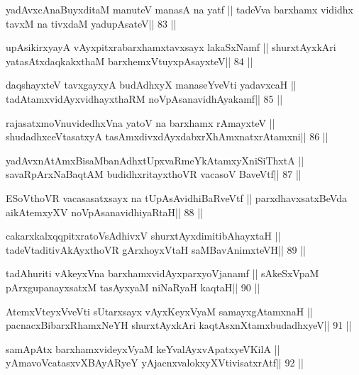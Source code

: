 \begin{shl}
yadAvxcA\s naBuyxditaM manuteV manasA na yatf ||
tadeVva barxhamx vididhx tavxM na tivxdaM yadupAsateV\hfill || 83 ||
\end{shl}

\begin{shl}
upAsikirxyayA vAyxpitxrabarxhamxtavxsayx lakaSxNamf ||
shurxtAyx\s kAri yatasAtxdaqkakxthaM barxhemxVtuyxpAsayxteV\hfill || 84 ||
\end{shl}

\begin{shl}
daqshayxteV tavxgayxyA budAdhxyX manaseYveVti yadavxcaH ||
tadAtamxvidAyxvidhayxthaRM noVpAsanavidhAyakamf\hfill || 85 ||
\end{shl}

\begin{shl}
rajasatxmoVnuvidedhxVna yatoV na barxhamx rAmayxteV ||
shudadhxceVtasatxyA tasAmxdivxdAyxdabxrXhAmxnatxrAtamxni\hfill || 86 ||
\end{shl}

\begin{shl}
yadAvx\s nAtAmxBisaMbanAdhxtUpxvaRmeYkAtamxyXniSiThxtA ||
savaRpArxNaBaqtAM budidhxritayxthoVR vacasoV BaveVtf\hfill || 87 ||
\end{shl}

\begin{shl}
ESoV\s thoVR vacasasatxsayx na tUpAsAvidhiBaRveVtf ||
parxdhavxsatxBeVda aikAtemxyXV noVpAsanavidhiyaRtaH\hfill || 88 ||
\end{shl}

\begin{shl}
cakarxkalxqqpitxratoV\s sAdhivxV shurxtAyxdimitibAhayxtaH ||
tadeVtaditivAkAyxthoVR gArxhoyxV\s taH saMBavAnimxteVH\hfill || 89 ||
\end{shl}

\begin{shl}
tadAhuriti vAkeyxVna barxhamxvidAyxparxyoVjanamf ||
sAkeSxVpaM pArxgupanayxsatxM tasAyxyaM niNaRyaH kaqtaH\hfill || 90 ||
\end{shl}

\begin{shl}
AtemxVteyxVveVti sUtarxsayx vAyxKeyxVyaM samayxgAtamxnaH ||
pacnacxBibarxRhamxNeYH shurxtAyx\s kAri kaqtAsxnXtamxbudadhxyeV\hfill || 91 ||
\end{shl}

\begin{shl}
samApAtx barxhamxvideyxVyaM keYvalAyxvApatxyeV\s KilA ||
yAmavoVcatasxvXBAyARyeY yAjacnxvalokxyXV\s tivisatxrAtf\hfill || 92 ||
\end{shl}

